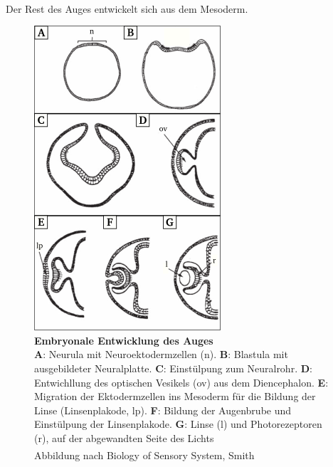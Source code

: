 \documentclass[12pt,a4paper,pdftex]{article}
\begin{document}
Der Rest des Auges entwickelt sich aus dem Mesoderm. \textsuperscript{\cite[16]{smith2008biology}}

\begin{figure}[H]
    \centering
    \includegraphics{pictures/visual/Eye_Neurulation.png}
    \caption[Embryonale Entwicklung des Auges]{\textbf{Embryonale Entwicklung des Auges}\\
    \textbf{A}: Neurula mit Neuroektodermzellen (n). \textbf{B}: Blastula mit ausgebildeter Neuralplatte. \textbf{C}: Einstülpung zum Neuralrohr. \textbf{D}: Entwichllung des optischen Vesikels (ov) aus dem Diencephalon. \textbf{E}: Migration der Ektodermzellen ins Mesoderm für die Bildung der Linse (Linsenplakode, lp). \textbf{F}: Bildung der Augenbrube und Einstülpung der Linsenplakode. \textbf{G}: Linse (l) und Photorezeptoren (r), auf der abgewandten Seite des Lichts\\
    Abbildung nach Biology of Sensory System, Smith \textsuperscript{\cite[16]{smith2008biology}}}
    \label{fig:eye_neurulation}
\end{figure}
\end{document}

